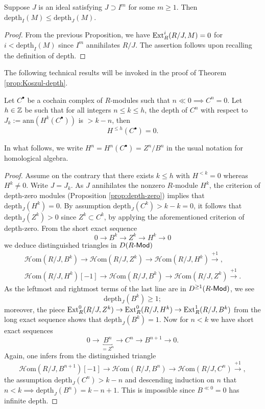 \begin{lemma}\label{prop:depth-power}
	Suppose $J$ is an ideal satisfying $J \supset I^m$ for some $m \geq 1$. Then $\mathrm{depth}_I(M) \leq \mathrm{depth}_J(M)$.
\end{lemma}
\begin{proof}
	From the previous Proposition, we have $\operatorname{Ext}^i_R(R/J, M) = 0$ for $i < \text{depth}_I(M)$ since $I^m$ annihilates $R/J$. The assertion follows upon recalling the definition of depth.
\end{proof}

The following technical results will be invoked in the proof of Theorem \ref{prop:Koszul-depth}.
\begin{proposition}\label{prop:depth-vanishing-aux}
	Let $C^\bullet$ be a cochain complex of $R$-modules such that $n \ll 0 \implies C^n = 0$. Let $h \in \mathbb{Z}$ be such that for all integers $n \leq k \leq h$, the depth of $C^n$ with respect to $J_k := \mathrm{ann}(H^k(C^\bullet))$ is $> k-n$, then
	\[ H^{\leq h}(C^\bullet)=0. \]
\end{proposition}
In what follows, we write $H^n = H^n(C^\bullet) = Z^n/B^n$ in the usual notation for homological algebra.
\begin{proof}
	Assume on the contrary that there exists $k \leq h$ with $H^{< k} = 0$ whereas $H^k \neq 0$. Write $J = J_k$. As $J$ annihilates the nonzero $R$-module $H^k$, the criterion of depth-zero modules (Proposition \ref{prop:depth-zero}) implies that $\text{depth}_J(H^k) = 0$. By assumption $\text{depth}_J(C^k) > k-k = 0$, it follows that $\text{depth}_J(Z^k) > 0$ since $Z^k \subset C^k$, by applying the aforementioned criterion of depth-zero. From the short exact sequence
	\[ 0 \to B^k \to Z^k \to H^k \to 0 \]
	we deduce distinguished triangles in $D(R\text{-}\mathsf{Mod})$
	\begin{gather*}
		\mathcal{H}\text{om}(R/J, B^k) \to \mathcal{H}\text{om}(R/J, Z^k) \to \mathcal{H}\text{om}(R/J, H^k) \xrightarrow{+1}, \\
		\mathcal{H}\text{om}(R/J, H^k)[-1] \to \mathcal{H}\text{om}(R/J, B^k) \to \mathcal{H}\text{om}(R/J, Z^k) \xrightarrow{+1}.
	\end{gather*}
	As the leftmost and rightmost terms of the last line are in $D^{\geq 1}(R\text{-}\mathsf{Mod})$, we see
	\[ \text{depth}_J(B^k) \geq 1; \]
	moreover, the piece $\operatorname{Ext}_R^0(R/J, Z^k) \to \operatorname{Ext}_R^0(R/J, H^k) \to \operatorname{Ext}_R^1(R/J, B^k)$ from the long exact sequence shows that $\text{depth}_J(B^k) = 1$. Now for $n < k$ we have short exact sequences
	\[ 0 \to \underbracket{B^n}_{= Z^n} \to C^n \to B^{n+1} \to 0. \]
	Again, one infers from the distinguished triangle
	\[ \mathcal{H}\text{om}(R/J, B^{n+1})[-1] \to \mathcal{H}\text{om}(R/J, B^n) \to \mathcal{H}\text{om}(R/J, C^n) \xrightarrow{+1} , \]
	the assumption $\text{depth}_J(C^n) > k-n$ and descending induction on $n$ that $n < k \implies \text{depth}_J(B^n) = k-n+1$. This is impossible since $B^{\ll 0} = 0$ has infinite depth.
\end{proof}

